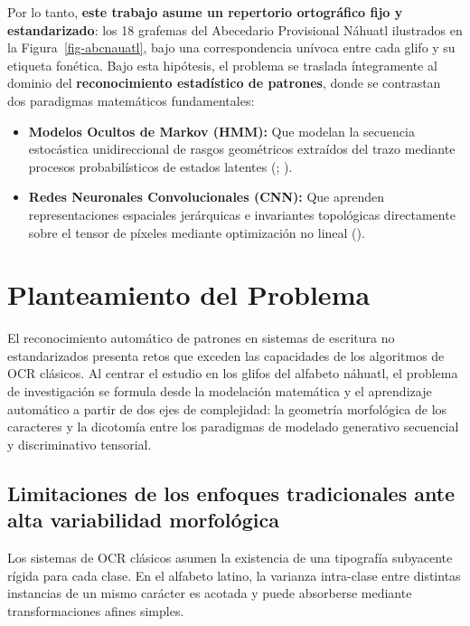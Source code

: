 \documentclass[
  spanish,
  us-letterpaper,
]{scrreprt}
\theoremstyle{definition}
\theoremstyle{remark}
\begin{document}
Por lo tanto, \textbf{este trabajo asume un repertorio ortográfico fijo
y estandarizado}: los 18 grafemas del Abecedario Provisional Náhuatl
ilustrados en la Figura~\ref{fig-abcnauatl}, bajo una correspondencia
unívoca entre cada glifo y su etiqueta fonética. Bajo esta hipótesis, el
problema se traslada íntegramente al dominio del \textbf{reconocimiento
estadístico de patrones}, donde se contrastan dos paradigmas matemáticos
fundamentales:

\begin{itemize}
\item
  \textbf{Modelos Ocultos de Markov (HMM):} Que modelan la secuencia
  estocástica unidireccional de rasgos geométricos extraídos del trazo
  mediante procesos probabilísticos de estados latentes
  (;
  ).
\item
  \textbf{Redes Neuronales Convolucionales (CNN):} Que aprenden
  representaciones espaciales jerárquicas e invariantes topológicas
  directamente sobre el tensor de píxeles mediante optimización no
  lineal ().
\end{itemize}

\section{Planteamiento del Problema}\label{planteamiento-del-problema}

El reconocimiento automático de patrones en sistemas de escritura no
estandarizados presenta retos que exceden las capacidades de los
algoritmos de OCR clásicos. Al centrar el estudio en los glifos del
alfabeto náhuatl, el problema de investigación se formula desde la
modelación matemática y el aprendizaje automático a partir de dos ejes
de complejidad: la geometría morfológica de los caracteres y la
dicotomía entre los paradigmas de modelado generativo secuencial y
discriminativo tensorial.

\subsection{Limitaciones de los enfoques tradicionales ante alta
variabilidad
morfológica}\label{limitaciones-de-los-enfoques-tradicionales-ante-alta-variabilidad-morfoluxf3gica}

Los sistemas de OCR clásicos asumen la existencia de una tipografía
subyacente rígida para cada clase. En el alfabeto latino, la varianza
intra-clase entre distintas instancias de un mismo carácter es acotada y
puede absorberse mediante transformaciones afines simples.
\end{document}
